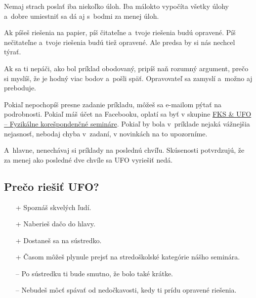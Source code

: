     Nemaj strach poslať iba niekoľko úloh. Iba málokto vypočíta všetky úlohy a~dobre umiestniť sa dá aj s~bodmi za menej úloh.

    Ak píšeš riešenia na papier, píš čitateľne a~tvoje riešenia budú opravené. Píš nečitateľne a~tvoje riešenia budú tiež opravené. Ale predsa by si nás nechcel týrať.

    Ak sa ti nepáči, ako bol príklad obodovaný, pripíš naň rozumný argument, prečo si myslíš, že je hodný viac bodov a~pošli späť. Opravovateľ sa zamyslí a~možno aj preboduje.

    Pokiaľ nepochopíš presne zadanie príkladu, môžeš sa e-mailom pýtať na podrobnosti. Pokiaľ máš účet na Facebooku, oplatí sa byť v skupine
    \href{https://www.facebook.com/groups/fks.ufo/}{FKS \& UFO -- Fyzikálne korešpondenčné semináre}.
    Pokiaľ by bola v~príklade nejaká vážnejšia nejasnosť, nebodaj chyba v~zadaní, v novinkách na to upozorníme.

    A~hlavne, nenechávaj si príklady na poslednú chvíľu. Skúsenosti potvrdzujú, že za menej ako posledné dve chvíle sa UFO vyriešiť nedá.

\subsection{Prečo riešiť UFO?}
    \begin{itemize}
        \item[+] Spoznáš skvelých ľudí.
        \item[+] Naberieš dačo do hlavy.
        \item[+] Dostaneš sa na sústredko.
        \item[+] Časom môžeš plynule prejsť na stredoškolské kategórie nášho seminára.

        \item[--] Po sústredku ti bude smutno, že bolo také krátke.
        \item[--] Nebudeš môcť spávať od nedočkavosti, kedy ti prídu opravené riešenia.
    \end{itemize}
